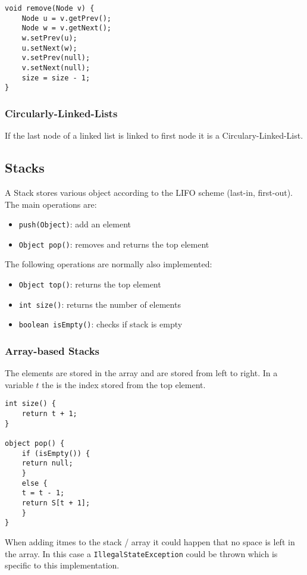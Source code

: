 \documentclass[11pt,twoside,landscape]{article}
\begin{document}
\begin{multicols}{2}
\begin{verbatim}
void remove(Node v) {
    Node u = v.getPrev();
    Node w = v.getNext();
    w.setPrev(u);
    u.setNext(w);
    v.setPrev(null);
    v.setNext(null);
    size = size - 1;
}
\end{verbatim}

\subsubsection*{Circularly-Linked-Lists}
\label{sec:org715d28e}
If the last node of a linked list is linked to first node it is a Circulary-Linked-List.

\subsection*{Stacks}
\label{sec:org7005b50}
A Stack stores various object according to the LIFO scheme (last-in, first-out). The main operations are:
\begin{itemize}
\item \texttt{push(Object)}: add an element
\item \texttt{Object pop()}: removes and returns the top element
\end{itemize}

The following operations are normally also implemented:
\begin{itemize}
\item \texttt{Object top()}: returns the top element
\item \texttt{int size()}: returns the number of elements
\item \texttt{boolean isEmpty()}: checks if stack is empty
\end{itemize}

\subsubsection*{Array-based Stacks}
\label{sec:orgd3f5233}
The elements are stored in the array and are stored from left to right. In a variable \(t\) the is the index stored from the top element.
\begin{verbatim}
int size() {
    return t + 1;
}

object pop() {
    if (isEmpty()) {
	return null;
    }
    else {
	t = t - 1;
	return S[t + 1];
    }
}
\end{verbatim}

When adding itmes to the stack / array it could happen that no space is left in the array. In this case a \texttt{IllegalStateException} could be thrown which is specific to this implementation.


\end{multicols}
\end{document}
